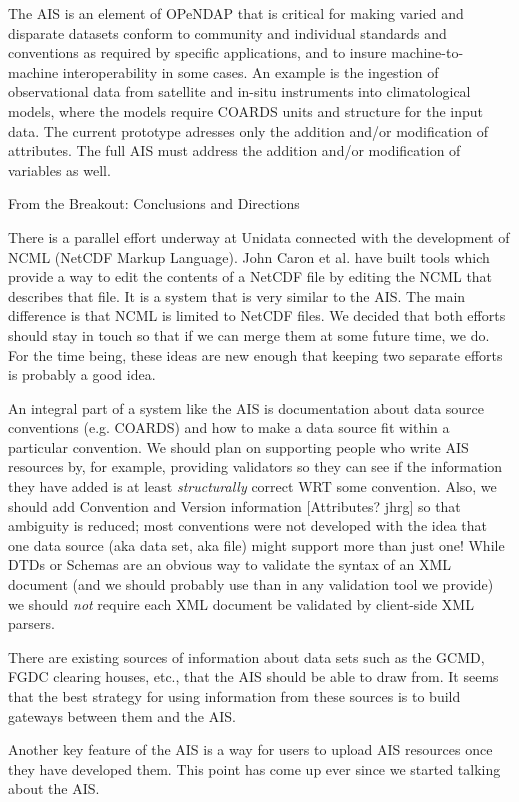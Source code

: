 The \ac{AIS} is an element of \ac{OPeNDAP} that is critical for making
varied and disparate datasets conform to community and individual
standards and conventions as required by specific applications, and
to insure machine-to-machine interoperability in some cases.  An example 
is the ingestion of observational data from satellite and in-situ instruments 
into climatological models, where the models require \ac{COARDS} units
and structure for the input data.  The current prototype adresses
only the addition and/or modification of attributes.  The full
\ac{AIS} must address the addition and/or modification of
variables as well.

From the Breakout: Conclusions and Directions

There is a parallel effort underway at Unidata connected with the development
of NCML (NetCDF Markup Language). John Caron et al. have built tools which
provide a way to edit the contents of a NetCDF file by editing the NCML that
describes that file. It is a system that is very similar to the AIS. The main
difference is that NCML is limited to NetCDF files. We decided that both
efforts should stay in touch so that if we can merge them at some future
time, we do. For the time being, these ideas are new enough that keeping two
separate efforts is probably a good idea.

An integral part of a system like the AIS is documentation about data source
conventions (e.g. COARDS) and how to make a data source fit within a
particular convention. We should plan on supporting people who write AIS
resources by, for example, providing validators so they can see if the
information they have added is at least \emph{structurally} correct WRT some
convention. Also, we should add Convention and Version information
[Attributes? jhrg] so that ambiguity is reduced; most conventions were not
developed with the idea that one data source (aka data set, aka file) might
support more than just one! While DTDs or Schemas are an obvious way to
validate the syntax of an XML document (and we should probably use than in
any validation tool we provide) we should \emph{not} require each XML document be
validated by client-side XML parsers.

There are existing sources of information about data sets such as the GCMD,
FGDC clearing houses, etc., that the AIS should be able to draw from. It
seems that the best strategy for using information from these sources is to
build gateways between them and the AIS.

Another key feature of the AIS is a way for users to upload AIS resources
once they have developed them. This point has come up ever since we started
talking about the AIS.

